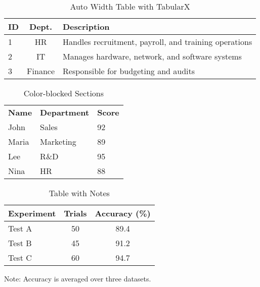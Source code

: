 \documentclass[12pt,a4paper]{article}
\begin{document}
	\begin{table}[H]
		\centering
		\caption{Auto Width Table with TabularX}
		\begin{tabularx}{0.9\textwidth}{l c X}
			\toprule
			\textbf{ID} & \textbf{Dept.} & \textbf{Description} \\
			\midrule
			1 & HR & Handles recruitment, payroll, and training operations \\
			2 & IT & Manages hardware, network, and software systems \\
			3 & Finance & Responsible for budgeting and audits \\
			\bottomrule
		\end{tabularx}
	\end{table}
	
	\begin{table}[H]
		\centering
		\caption{Color-blocked Sections}
		\begin{tabular}{p{3cm}p{3cm}p{3cm}}
			\rowcolor{blue!30}
			\textbf{Name} & \textbf{Department} & \textbf{Score} \\
			\rowcolor{blue!10}
			John & Sales & 92 \\
			Maria & Marketing & 89 \\
			Lee & R\&D & 95 \\
			\rowcolor{blue!10}
			Nina & HR & 88 \\
		\end{tabular}
	\end{table}
	
	\begin{table}[H]
		\centering
		\caption{Table with Notes}
		\begin{threeparttable}
			\begin{tabular}{lcc}
				\toprule
				\textbf{Experiment} & \textbf{Trials} & \textbf{Accuracy (\%)} \\
				\midrule
				Test A & 50 & 89.4 \\
				Test B & 45 & 91.2 \\
				Test C & 60 & 94.7 \\
				\bottomrule
			\end{tabular}
			\begin{tablenotes}
				\footnotesize
				\item Note: Accuracy is averaged over three datasets.
			\end{tablenotes}
		\end{threeparttable}
	\end{table}
	
\end{document}
